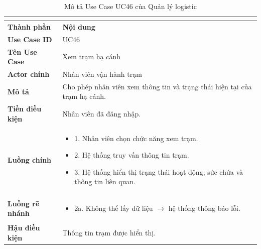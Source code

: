 \begin{longtable}{|C{3cm}|L{11cm}|}
\caption{Mô tả Use Case UC46 của Quản lý logistic}\\
\label{tab:mo-ta-uc46-quan-ly-logistic}\\
\hline
\textbf{Thành phần} & \textbf{Nội dung} \\
\hline
\textbf{Use Case ID} & UC46 \\
\hline
\textbf{Tên Use Case} & Xem trạm hạ cánh \\
\hline
\textbf{Actor chính} & Nhân viên vận hành trạm \\
\hline
\textbf{Mô tả} & Cho phép nhân viên xem thông tin và trạng thái hiện tại của trạm hạ cánh. \\
\hline
\textbf{Tiền điều kiện} & Nhân viên đã đăng nhập. \\
\hline
\textbf{Luồng chính} &
\begin{itemize}[leftmargin=*,topsep=2pt,itemsep=2pt]
    \item 1. Nhân viên chọn chức năng xem trạm.
    \item 2. Hệ thống truy vấn thông tin trạm.
    \item 3. Hệ thống hiển thị trạng thái hoạt động, sức chứa và thông tin liên quan.
\end{itemize} \\
\hline
\textbf{Luồng rẽ nhánh} &
\begin{itemize}[leftmargin=*,topsep=2pt,itemsep=2pt]
    \item 2a. Không thể lấy dữ liệu $\rightarrow$ hệ thống thông báo lỗi.
\end{itemize} \\
\hline
\textbf{Hậu điều kiện} & Thông tin trạm được hiển thị. \\
\hline
\end{longtable}


